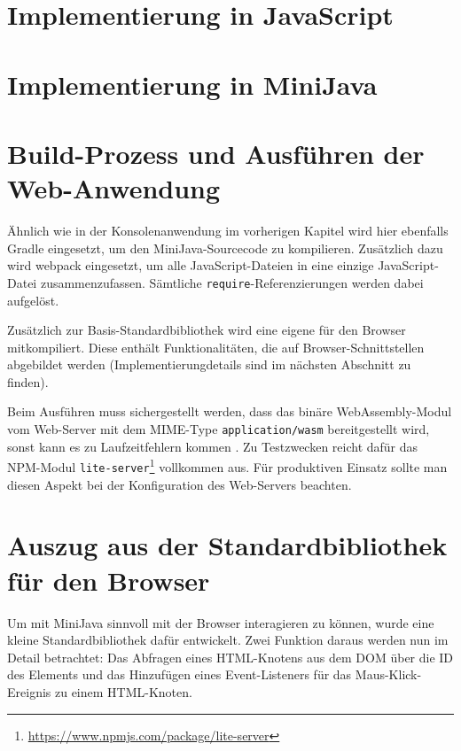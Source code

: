 \section{Implementierung in JavaScript}



\section{Implementierung in MiniJava}





\section{Build-Prozess und Ausführen der Web-Anwendung}

Ähnlich wie in der Konsolenanwendung im vorherigen Kapitel wird hier ebenfalls Gradle eingesetzt, um den MiniJava-Sourcecode zu kompilieren. Zusätzlich dazu wird webpack \cite{Webpack} eingesetzt, um alle JavaScript-Dateien in eine einzige JavaScript-Datei zusammenzufassen. Sämtliche \lstinline{require}-Referenzierungen werden dabei aufgelöst.

Zusätzlich zur Basis-Standardbibliothek wird eine eigene für den Browser mitkompiliert. Diese enthält Funktionalitäten, die auf Browser-Schnittstellen abgebildet werden (Implementierungdetails sind im nächsten Abschnitt zu finden).

Beim Ausführen muss sichergestellt werden, dass das binäre WebAssembly-Modul vom Web-Server mit dem MIME-Type \lstinline{application/wasm} bereitgestellt wird, sonst kann es zu Laufzeitfehlern kommen \cite{MDNWebAssembly}. Zu Testzwecken reicht dafür das NPM-Modul \lstinline{lite-server}\footnote{\url{https://www.npmjs.com/package/lite-server}} vollkommen aus. Für produktiven Einsatz sollte man diesen Aspekt bei der Konfiguration des Web-Servers beachten.

\section{Auszug aus der Standardbibliothek für den Browser}

Um mit MiniJava sinnvoll mit der Browser interagieren zu können, wurde eine kleine Standardbibliothek dafür entwickelt. Zwei Funktion daraus werden nun im Detail betrachtet: Das Abfragen eines HTML-Knotens aus dem DOM über die ID des Elements und das Hinzufügen eines Event-Listeners für das Maus-Klick-Ereignis zu einem HTML-Knoten.

